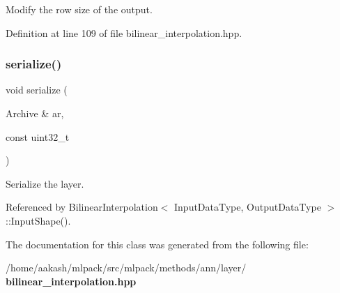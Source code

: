 Modify the row size of the output. 



Definition at line 109 of file bilinear\+\_\+interpolation.\+hpp.

\mbox{\label{classmlpack_1_1ann_1_1BilinearInterpolation_a65cba07328997659bec80b9879b15a51}} 
\subsubsection{serialize()}
{\footnotesize\ttfamily void serialize (\begin{DoxyParamCaption}\item[{Archive \&}]{ar,  }\item[{const uint32\+\_\+t}]{ }\end{DoxyParamCaption})}



Serialize the layer. 



Referenced by Bilinear\+Interpolation$<$ Input\+Data\+Type, Output\+Data\+Type $>$\+::\+Input\+Shape().



The documentation for this class was generated from the following file\+:\begin{DoxyCompactItemize}
\item 
/home/aakash/mlpack/src/mlpack/methods/ann/layer/\textbf{ bilinear\+\_\+interpolation.\+hpp}\end{DoxyCompactItemize}

